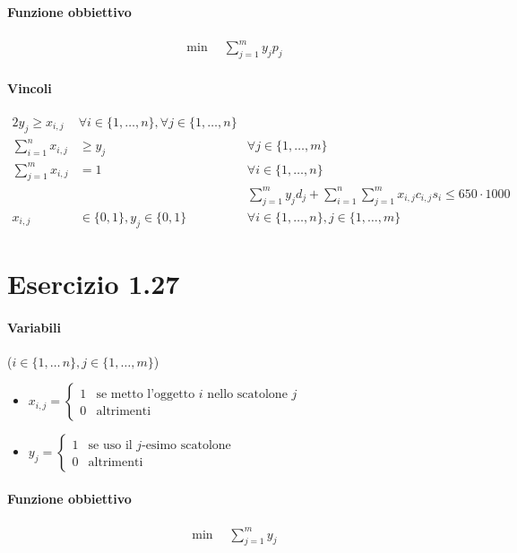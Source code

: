 \documentclass{article}
\begin{document}
\paragraph{Funzione obbiettivo}
\begin{align*}
  \min \quad \sum_{j=1}^m y_j p_j
\end{align*}

\paragraph{Vincoli}
\begin{alignat}{2}
  y_j \geq x_{i,j} &\forall i \in \{1,\ldots,n\}, \forall j \in \{1,\ldots,n\} \\
  \sum_{i=1}^n x_{i,j} &\geq y_j &\forall j \in \{1,\ldots,m\} \\
  \sum_{j=1}^m x_{i,j} &=1  &\forall i \in \{1,\ldots,n\} \\
  &&\sum_{j=1}^m y_j d_j + \sum_{i=1}^n\sum_{j=1}^m x_{i,j} c_{i,j} s_i \leq 650 \cdot 1000 \\
  x_{i,j} &\in \{0,1\}, y_j \in \{0,1\} &\forall i \in \{1,\ldots,n\}, j \in \{1,\ldots,m\}
\end{alignat}

\pagebreak
\section{Esercizio 1.27}

\paragraph{Variabili} ($i \in \{1,\ldots\,n\}, j \in \{1,\ldots,m\}$)
\begin{itemize}
  \item $x_{i,j} = \begin{cases}
      1 & \text{se metto l'oggetto }i\text{ nello scatolone }j \\
      0 & \text{altrimenti}
  \end{cases}$
  \item $y_j = \begin{cases}
      1 & \text{se uso il }j\text{-esimo scatolone} \\
      0 & \text{altrimenti}
  \end{cases}$
\end{itemize}

\paragraph{Funzione obbiettivo}
\begin{align*}
  \min \quad \sum_{j=1}^m y_j
\end{align*}
\end{document}
